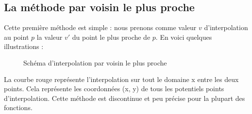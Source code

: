 


\subsection{La méthode par voisin le plus proche}
Cette première méthode est simple : nous prenons comme valeur \( v \) d'interpolation au point \( p \) la valeur \( v' \) du point le plus proche de \( p \).
En voici quelques illustrations :


\begin{figure}[H]
    \centering
    \caption{Schéma d'interpolation par voisin le plus proche}
    \label{fig:interpolation_voisin}
\end{figure}

La courbe rouge représente l'interpolation sur tout le domaine x entre les deux points. Cela représente les coordonnées (x, y) de tous les potentiels points d'interpolation.
Cette méthode est discontinue et peu précise pour la plupart des fonctions.



